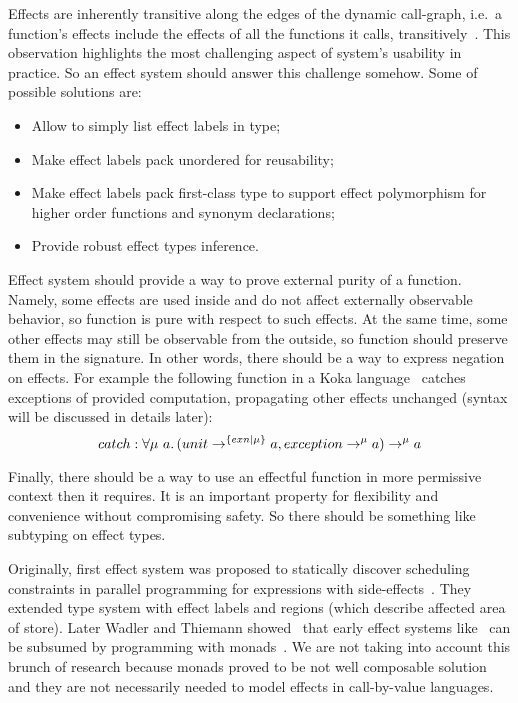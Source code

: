 \documentclass[conference]{IEEEtran}
\newcommand{\ap}{~}
\begin{document}
    Effects are inherently transitive along the edges of the dynamic call-graph, i.e.\ a function’s effects include the effects of all the functions it calls, transitively~\cite{odersky2022scoped}.
    This observation highlights the most challenging aspect of system's usability in practice.
    So an effect system should answer this challenge somehow.
    Some of possible solutions are:
    \begin{itemize}
        \item Allow to simply list effect labels in type;
        \item Make effect labels pack unordered for reusability;
        \item Make effect labels pack first-class type to support effect polymorphism for higher order functions and synonym declarations;
        \item Provide robust effect types inference.
    \end{itemize}

    Effect system should provide a way to prove external purity of a function.
    Namely, some effects are used inside and do not affect externally observable behavior, so function is pure with respect to such effects.
    At the same time, some other effects may still be observable from the outside, so function should preserve them in the signature.
    In other words, there should be a way to express negation on effects.
    For example the following function in a Koka language~\cite{leijen2014koka, leijen2017type} catches exceptions of provided computation, propagating other effects unchanged (syntax will be discussed in details later):
    \[catch : \forall \mu\ap a\ldotp (unit\to^{\{exn|\mu\}} a, exception \to^{\mu} a) \to^\mu a\]

    Finally, there should be a way to use an effectful function in more permissive context then it requires.
    It is an important property for flexibility and convenience without compromising safety.
    So there should be something like subtyping on effect types.

    Originally, first effect system was proposed to statically discover scheduling constraints in parallel programming for expressions with side-effects~\cite{lucassen1988polymorphic}.
    They extended type system with effect labels and regions (which describe affected area of store).
    Later Wadler and Thiemann showed~\cite{wadler2003marriage} that early effect systems like~\cite{lucassen1988polymorphic} can be subsumed by programming with monads~\cite{moggi1988computational}.
    We are not taking into account this brunch of research because monads proved to be not well composable solution~\cite{liang1995monad, kiselyov2013extensible} and they are not necessarily needed to model effects in call-by-value languages.
\end{document}
